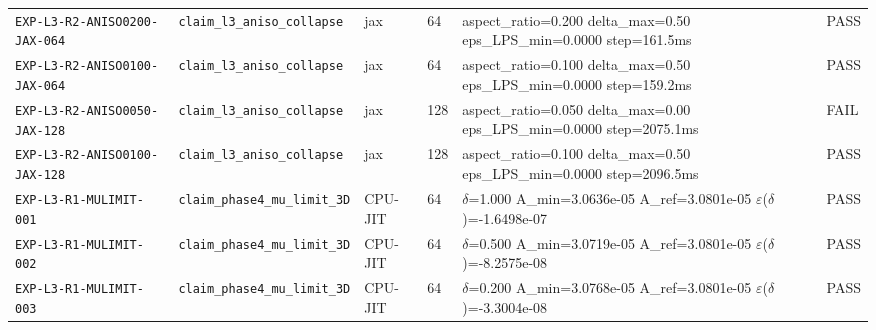 {\begin{longtable}{@{}>{\raggedright\arraybackslash}p{} >{\raggedright\arraybackslash}p{} l l >{\raggedright\arraybackslash}p{} l@{}}
\texttt{EXP-\allowbreak{}L3-\allowbreak{}R2-\allowbreak{}ANISO0200-\allowbreak{}JAX-\allowbreak{}064} & \texttt{claim\_\allowbreak{}l3\_\allowbreak{}aniso\_\allowbreak{}collapse} & jax & 64 & aspect\_\allowbreak{}ratio=\allowbreak{}0.200  delta\_\allowbreak{}max=\allowbreak{}0.50  eps\_\allowbreak{}LPS\_\allowbreak{}min=\allowbreak{}0.0000  step=\allowbreak{}161.5ms & \textsf{PASS}\\
\texttt{EXP-\allowbreak{}L3-\allowbreak{}R2-\allowbreak{}ANISO0100-\allowbreak{}JAX-\allowbreak{}064} & \texttt{claim\_\allowbreak{}l3\_\allowbreak{}aniso\_\allowbreak{}collapse} & jax & 64 & aspect\_\allowbreak{}ratio=\allowbreak{}0.100  delta\_\allowbreak{}max=\allowbreak{}0.50  eps\_\allowbreak{}LPS\_\allowbreak{}min=\allowbreak{}0.0000  step=\allowbreak{}159.2ms & \textsf{PASS}\\
\texttt{EXP-\allowbreak{}L3-\allowbreak{}R2-\allowbreak{}ANISO0050-\allowbreak{}JAX-\allowbreak{}128} & \texttt{claim\_\allowbreak{}l3\_\allowbreak{}aniso\_\allowbreak{}collapse} & jax & 128 & aspect\_\allowbreak{}ratio=\allowbreak{}0.050  delta\_\allowbreak{}max=\allowbreak{}0.00  eps\_\allowbreak{}LPS\_\allowbreak{}min=\allowbreak{}0.0000  step=\allowbreak{}2075.1ms & \textsf{FAIL}\\
\texttt{EXP-\allowbreak{}L3-\allowbreak{}R2-\allowbreak{}ANISO0100-\allowbreak{}JAX-\allowbreak{}128} & \texttt{claim\_\allowbreak{}l3\_\allowbreak{}aniso\_\allowbreak{}collapse} & jax & 128 & aspect\_\allowbreak{}ratio=\allowbreak{}0.100  delta\_\allowbreak{}max=\allowbreak{}0.50  eps\_\allowbreak{}LPS\_\allowbreak{}min=\allowbreak{}0.0000  step=\allowbreak{}2096.5ms & \textsf{PASS}\\
\texttt{EXP-\allowbreak{}L3-\allowbreak{}R1-\allowbreak{}MULIMIT-\allowbreak{}001} & \texttt{claim\_\allowbreak{}phase4\_\allowbreak{}mu\_\allowbreak{}limit\_\allowbreak{}3D} & CPU-\allowbreak{}JIT & 64 & $\delta$=\allowbreak{}1.000  A\_\allowbreak{}min=\allowbreak{}3.0636e-05  A\_\allowbreak{}ref=\allowbreak{}3.0801e-05  $\varepsilon$($\delta$)=-\allowbreak{}1.6498e-07 & \textsf{PASS}\\
\texttt{EXP-\allowbreak{}L3-\allowbreak{}R1-\allowbreak{}MULIMIT-\allowbreak{}002} & \texttt{claim\_\allowbreak{}phase4\_\allowbreak{}mu\_\allowbreak{}limit\_\allowbreak{}3D} & CPU-\allowbreak{}JIT & 64 & $\delta$=\allowbreak{}0.500  A\_\allowbreak{}min=\allowbreak{}3.0719e-05  A\_\allowbreak{}ref=\allowbreak{}3.0801e-05  $\varepsilon$($\delta$)=-\allowbreak{}8.2575e-08 & \textsf{PASS}\\
\texttt{EXP-\allowbreak{}L3-\allowbreak{}R1-\allowbreak{}MULIMIT-\allowbreak{}003} & \texttt{claim\_\allowbreak{}phase4\_\allowbreak{}mu\_\allowbreak{}limit\_\allowbreak{}3D} & CPU-\allowbreak{}JIT & 64 & $\delta$=\allowbreak{}0.200  A\_\allowbreak{}min=\allowbreak{}3.0768e-05  A\_\allowbreak{}ref=\allowbreak{}3.0801e-05  $\varepsilon$($\delta$)=-\allowbreak{}3.3004e-08 & \textsf{PASS}\\

\end{longtable}}
